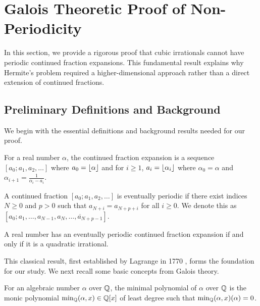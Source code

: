 \section{Galois Theoretic Proof of Non-Periodicity}\label{sec:galois_theory}

In this section, we provide a rigorous proof that cubic irrationals cannot have periodic continued fraction expansions. This fundamental result explains why Hermite's problem required a higher-dimensional approach rather than a direct extension of continued fractions.

\subsection{Preliminary Definitions and Background}

We begin with the essential definitions and background results needed for our proof.

\begin{definition}
For a real number $\alpha$, the continued fraction expansion is a sequence $[a_0; a_1, a_2, \ldots]$ where $a_0 = \lfloor \alpha \rfloor$ and for $i \geq 1$, $a_i = \lfloor \alpha_i \rfloor$ where $\alpha_0 = \alpha$ and $\alpha_{i+1} = \frac{1}{\alpha_i - a_i}$.
\end{definition}

\begin{definition}
A continued fraction $[a_0; a_1, a_2, \ldots]$ is eventually periodic if there exist indices $N \geq 0$ and $p > 0$ such that $a_{N+i} = a_{N+p+i}$ for all $i \geq 0$. We denote this as $[a_0; a_1, \ldots, a_{N-1}, \overline{a_N, \ldots, a_{N+p-1}}]$.
\end{definition}

\begin{theorem}\label{thm:lagrange}
A real number has an eventually periodic continued fraction expansion if and only if it is a quadratic irrational.
\end{theorem}

This classical result, first established by Lagrange in 1770 \cite{Lagrange1770}, forms the foundation for our study. We next recall some basic concepts from Galois theory.

\begin{definition}
For an algebraic number $\alpha$ over $\mathbb{Q}$, the minimal polynomial of $\alpha$ over $\mathbb{Q}$ is the monic polynomial $\text{min}_{\mathbb{Q}}(\alpha, x) \in \mathbb{Q}[x]$ of least degree such that $\text{min}_{\mathbb{Q}}(\alpha, x)(\alpha) = 0$.
\end{definition}

